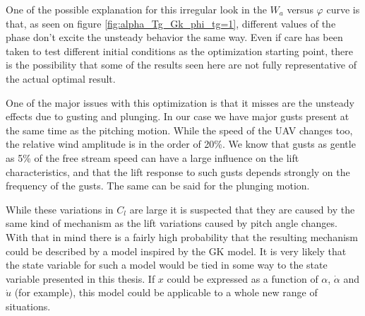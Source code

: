 \par One of the possible explanation for this irregular look in the $W_a$ versus $\varphi$ curve is that, as seen on figure \ref{fig:alpha_Tg_Gk_phi_tg=1}, different values of the phase don't excite the unsteady behavior the same way.
Even if care has been taken to test different initial conditions as the optimization starting point, there is the possibility that some of the results seen here are not fully representative of the actual optimal result.


\FloatBarrier
{}
One of the major issues with this optimization is that it misses are the unsteady effects due to gusting and plunging.
In our case we have major gusts present at the same time as the pitching motion.
While the speed of the UAV changes too, the relative wind amplitude is in the order of 20\%.
We know that gusts as gentle as 5\% of the free stream speed can have a large influence on the lift characteristics, and that the lift response to such gusts depends strongly on the frequency of the gusts.
The same can be said for the plunging motion.

\par While these variations in $C_l$ are large it is suspected that they are caused by the same kind of mechanism as the lift variations caused by pitch angle changes.
With that in mind there is a fairly high probability that the resulting mechanism could be described by a model inspired by the GK model.
It is very likely that the state variable for such a model would be tied in some way to the state variable presented in this thesis.
If $x$ could be expressed as a function of $\alpha$, $\dot{\alpha}$ and $\dot{u}$ (for example), this model could be applicable to a whole new range of situations.

